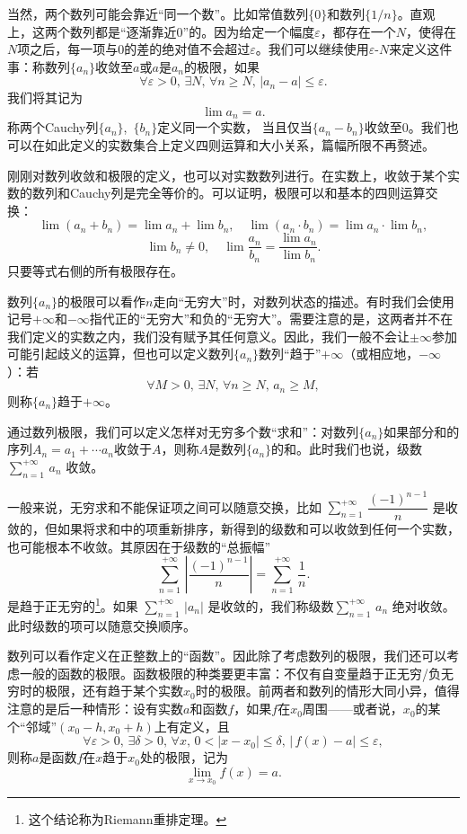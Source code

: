 当然，两个数列可能会靠近“同一个数”。比如常值数列$\{0\}$和数列$\{ 1/n\}$。直观上，这两个数列都是“逐渐靠近$0$”的。因为给定一个幅度$\varepsilon$，都存在一个$N$，使得在$N$项之后，每一项与$0$的差的绝对值不会超过$\varepsilon$。我们可以继续使用$\varepsilon\text{-}N$来定义这件事：称数列$\{a_n\}$收敛至$a$或$a$是$a_n$的极限，如果
\[\forall \varepsilon>0,\,\exists N,\,\forall n\geq N,\,|a_n-a|\leq \varepsilon.\]
我们将其记为
\[\lim a_n=a.\]
称两个Cauchy列$\{a_n\}$,~$\{b_n\}$定义同一个实数，
当且仅当$\{a_n-b_n\}$收敛至$0$。我们也可以在如此定义的实数集合上定义四则运算和大小关系，篇幅所限不再赘述。

刚刚对数列收敛和极限的定义，也可以对实数数列进行。在实数上，收敛于某个实数的数列和Cauchy列是完全等价的。可以证明，极限可以和基本的四则运算交换：
\[
    \lim(a_n+b_n)=\lim a_n+\lim b_n,\quad\lim(a_n\cdot b_n)=\lim a_n\cdot \lim b_n,
\]
\[\lim b_n\neq 0,\quad\lim \frac {a_n}{b_n}=\frac{\lim a_n}{\lim b_n}.\]
只要等式右侧的所有极限存在。

数列$\{a_n\}$的极限可以看作$n$走向“无穷大”时，对数列状态的描述。有时我们会使用记号$+\infty$和$-\infty$指代正的“无穷大”和负的“无穷大”。需要注意的是，这两者并不在我们定义的实数之内，我们没有赋予其任何意义。因此，我们一般不会让$\pm\infty$参加可能引起歧义的运算，但也可以定义数列$\{a_n\}$数列“趋于”$+\infty$（或相应地，$-\infty$）：若
\[\forall  M>0,\,\exists N,\,\forall n\geq N,\,a_n\geq M,\]
则称$\{a_n\}$趋于$+\infty$。

通过数列极限，我们可以定义怎样对无穷多个数“求和”：对数列$\{a_n\}$如果部分和的序列$A_n=a_1+\cdots a_n$收敛于$A$，则称$A$是数列$\{a_n\}$的和。此时我们也说，级数
$\sum_{n=1}^{+\infty}\,a_n$
收敛。

一般来说，无穷求和不能保证项之间可以随意交换，比如
$\sum_{n=1}^{+\infty}\,\dfrac{(-1)^{n-1}}{n}$
是收敛的，但如果将求和中的项重新排序，新得到的级数和可以收敛到任何一个实数，也可能根本不收敛。其原因在于级数的“总振幅”
\[\sum_{n=1}^{+\infty}\,\left|\dfrac{(-1)^{n-1}}{n}\right|=\sum_{n=1}^{+\infty}\,\dfrac{1}{n}.\]
是趋于正无穷的\footnote{这个结论称为Riemann重排定理。}。如果
$\sum_{n=1}^{+\infty}\,|a_n|$
是收敛的，我们称级数$\sum_{n=1}^{+\infty}\,a_n$
绝对收敛。此时级数的项可以随意交换顺序。

数列可以看作定义在正整数上的“函数”。因此除了考虑数列的极限，我们还可以考虑一般的函数的极限。函数极限的种类要更丰富：不仅有自变量趋于正无穷/负无穷时的极限，还有趋于某个实数$x_0$时的极限。前两者和数列的情形大同小异，值得注意的是后一种情形：设有实数$a$和函数$f$，如果$f$在$x_0$周围——或者说，$x_0$的某个“邻域”$(x_0-h,x_0+h)$上有定义，且
\[\forall \varepsilon>0,\,\exists \delta>0,\,\forall x,\,0<|x-x_0|\leq \delta,\,\bigl|\,f(x)-a\bigr|\leq \varepsilon,\]
则称$a$是函数$f$在$x$趋于$x_0$处的极限，记为
\[\lim_{x\to x_0}f(x)=a.\]

